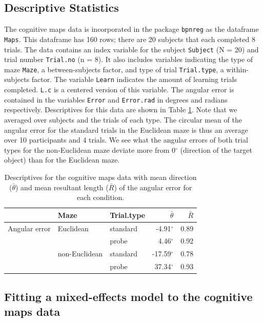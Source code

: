 \documentclass[11pt,]{article}
\begin{document}
\subsection{Descriptive Statistics}\label{DescriptiveMaps}

The cognitive maps data is incorporated in the package \verb|bpnreg| as
the dataframe \verb|Maps|. This dataframe has 160 rows; there are 20
subjects that each completed 8 trials. The data contains an index
variable for the subject \verb|Subject| (N = 20) and trial number
\verb|Trial.no| (n = 8). It also includes variables indicating the type
of maze \verb|Maze|, a between-subjects factor, and type of trial
\verb|Trial.type|, a within-subjects factor. The variable \verb|Learn|
indicates the amount of learning trials completed. \verb|L.c| is a
centered version of this variable. The angular error is contained in the
variables \verb|Error| and \verb|Error.rad| in degrees and radians
respectively. Descriptives for this data are shown in Table
\ref{TableDescriptivesMaps}. Note that we averaged over subjects and the
trials of each type. The circular mean of the angular error for the
standard trials in the Euclidean maze is thus an average over 10
participants and 4 trials. We see what the angular errors of both trial
types for the non-Euclidean maze deviate more from 0\(^{\circ}\)
(direction of the target object) than for the Euclidean maze.

\begin{table}
\centering
\caption{Descriptives for the cognitive maps data with mean direction ($\bar{\theta}$) and mean resultant length ($\bar{R}$) of the angular error for each condition.} 
\begin{tabular}{lllrr}
  \hline\noalign{\smallskip}
& Maze & Trial.type & $\bar{\theta}$ & $\bar{R}$  \\ \hline\noalign{\smallskip}
Angular error   & Euclidean     & standard & -4.91$^{\circ}$ & 0.89  \\
              &                   & probe    &  4.46$^{\circ}$ & 0.92   \\
                & non-Euclidean & standard & -17.59$^{\circ}$ & 0.78  \\
              &                   & probe    &  37.34$^{\circ}$ & 0.93  \\
   \hline
\end{tabular}
\label{TableDescriptivesMaps}
\end{table}

\subsection{Fitting a mixed-effects model to the cognitive maps data}\label{MEModelMaps}
\end{document}
